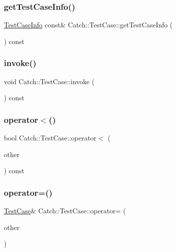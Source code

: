 \subsubsection{\texorpdfstring{get\+Test\+Case\+Info()}{getTestCaseInfo()}}
{\footnotesize\ttfamily \mbox{\hyperlink{struct_catch_1_1_test_case_info}{Test\+Case\+Info}} const\& Catch\+::\+Test\+Case\+::get\+Test\+Case\+Info (\begin{DoxyParamCaption}{ }\end{DoxyParamCaption}) const}

\mbox{\label{class_catch_1_1_test_case_a26f346c8446dded0562fe3818ae71651}} 
\subsubsection{\texorpdfstring{invoke()}{invoke()}}
{\footnotesize\ttfamily void Catch\+::\+Test\+Case\+::invoke (\begin{DoxyParamCaption}{ }\end{DoxyParamCaption}) const}

\mbox{\label{class_catch_1_1_test_case_a030e4b9282e9b32e08c8bd5e5cd6fa98}} 
\subsubsection{\texorpdfstring{operator$<$()}{operator<()}}
{\footnotesize\ttfamily bool Catch\+::\+Test\+Case\+::operator$<$ (\begin{DoxyParamCaption}\item[{\mbox{\hyperlink{class_catch_1_1_test_case}{Test\+Case}} const \&}]{other }\end{DoxyParamCaption}) const}

\mbox{\label{class_catch_1_1_test_case_a8022e3f74232f7887d2d2cbbc8876502}} 
\subsubsection{\texorpdfstring{operator=()}{operator=()}}
{\footnotesize\ttfamily \mbox{\hyperlink{class_catch_1_1_test_case}{Test\+Case}}\& Catch\+::\+Test\+Case\+::operator= (\begin{DoxyParamCaption}\item[{\mbox{\hyperlink{class_catch_1_1_test_case}{Test\+Case}} const \&}]{other }\end{DoxyParamCaption})}

